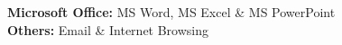 \newcommand{\skilltag}[2]{\textbf{#1:} #2}

\skilltag{Microsoft Office}{MS Word, MS Excel \& MS PowerPoint}\\[0.5em]
\skilltag{Others}{Email \& Internet Browsing}

\vspace{2mm}
